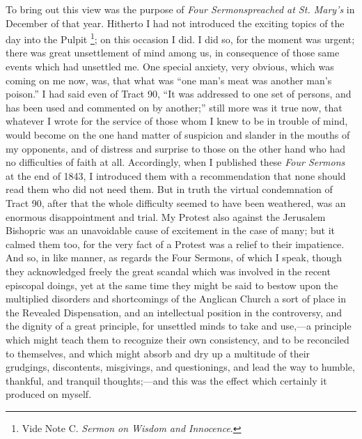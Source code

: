To bring out this view was the purpose of \emph{Four Sermons}\emph{preached at
St. Mary's} in December of that year. Hitherto I had not introduced the
exciting topics of the day into the Pulpit \footnote{Vide Note C. \emph{Sermon
on Wisdom and Innocence}.}; on this
occasion I did. I did so, for the moment was urgent; there was great
unsettlement of mind among us, in consequence of those same events which
had unsettled me. One special anxiety, very obvious, which was coming on
me now, was, that what was ``one man's meat was another man's
poison.'' I had said even of Tract 90, ``It was addressed to one
set of persons, and has been used and commented on by another;''
still more was it true now, that whatever I wrote for the service of
those whom I knew to be in trouble of mind, would become on the one hand
matter of suspicion and slander in the mouths of my opponents, and of
distress and surprise to those on the other hand who had no
difficulties of faith at all. Accordingly, when I published these \emph{Four
Sermons} at the end of 1843, I introduced them with a recommendation that
none should read them who did not need them. But in truth the virtual
condemnation of Tract 90, after that the whole difficulty seemed to have
been weathered, was an enormous disappointment and trial. My Protest
also against the Jerusalem Bishopric was an unavoidable cause of
excitement in the case of many; but it calmed them too, for the very
fact of a Protest was a relief to their impatience. And so, in like
manner, as regards the Four Sermons, of which I speak, though they
acknowledged freely the great scandal which was involved in the
recent episcopal doings, yet at the same time they might be said to
bestow upon the multiplied disorders and shortcomings of the Anglican
Church a sort of place in the Revealed Dispensation, and an intellectual
position in the controversy, and the dignity of a great principle, for
unsettled minds to take and use,—a principle which might teach them to recognize their own consistency, and to be reconciled to
themselves, and which might absorb and dry up a multitude
of their grudgings, discontents, misgivings, and questionings, and lead
the way to humble, thankful, and tranquil thoughts;—and this was the
effect which certainly it produced on myself.

